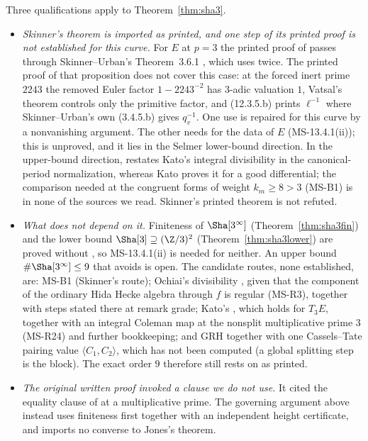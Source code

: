 \begin{remark}[Provenance at $3$]\label{rem:su}
Three qualifications apply to Theorem~\ref{thm:sha3}.
\begin{itemize}[leftmargin=*]
\item \emph{Skinner's theorem is imported as printed, and one step of its printed proof is not established for this curve.} For $E$ at $p=3$ the printed proof of \cite[Thm.~A]{skinner} passes through Skinner--Urban's Theorem~3.6.1 \cite{su}, which uses \cite[Prop.~12.3.6]{su} twice. The printed proof of that proposition does not cover this case: at the forced inert prime $2243$ the removed Euler factor $1-2243^{-2}$ has $3$-adic valuation $1$, Vatsal's theorem controls only the primitive factor, and (12.3.5.b) prints $\ell^{-1}$ where Skinner--Urban's own (3.4.5.b) gives $q_v^{-1}$. One use is repaired for this curve by a nonvanishing argument. The other needs \cite[Prop.~13.4.1(ii)]{su} for the data of $E$ (MS-13.4.1(ii)); this is unproved, and it lies in the Selmer lower-bound direction. In the upper-bound direction, \cite[Thm.~3.5.6]{su} restates Kato's integral divisibility in the canonical-period normalization, whereas Kato proves it for a good differential; the comparison needed at the congruent forms of weight $k_m\ge8>3$ (MS-B1) is in none of the sources we read. Skinner's printed theorem is not refuted.
\item \emph{What does not depend on it.} Finiteness of $\Sha[3^\infty]$ (Theorem~\ref{thm:sha3fin}) and the lower bound $\Sha[3]\supseteq(\Z/3)^2$ (Theorem~\ref{thm:sha3lower}) are proved without \cite{skinner}, so MS-13.4.1(ii) is needed for neither. An upper bound $\#\Sha[3^\infty]\le9$ that avoids \cite[Thm.~A]{skinner} is open. The candidate routes, none established, are: MS-B1 (Skinner's route); Ochiai's divisibility \cite[Thm.~3 and Cor.~7.5]{ochiai}, given that the component of the ordinary Hida Hecke algebra through $f$ is regular (MS-R3), together with steps stated there at remark grade; Kato's \cite[12.5(4)]{kato}, which holds for $T_3E$, together with an integral Coleman map at the nonsplit multiplicative prime $3$ (MS-R24) and further bookkeeping; and GRH together with one Cassels--Tate pairing value $\langle C_1,C_2\rangle$, which has not been computed (a global splitting step is the block). The exact order $9$ therefore still rests on \cite[Thm.~A]{skinner} as printed.
\item \emph{The original written proof invoked a clause we do not use.} It cited the equality clause of \cite[Thm.~6.1]{sw} at a multiplicative prime. The governing argument above instead uses finiteness first together with an independent height certificate, and imports no converse to Jones's theorem.
\end{itemize}
\end{remark}

